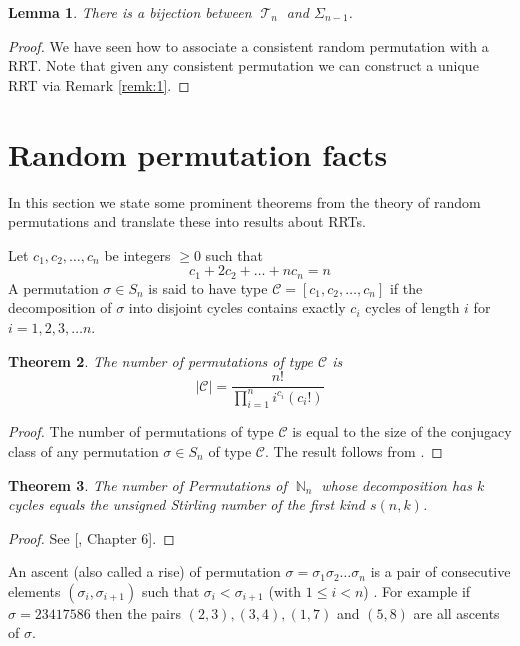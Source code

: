 \documentclass[oneside]{book} %
\newtheorem{thm}{Theorem}[section]
\newtheorem{lem}[thm]{Lemma}
\theoremstyle{definition}
\numberwithin{equation}{section}
\DeclareMathOperator{\T}{\mathcal{T}}
\DeclareMathOperator{\N}{\mathbb{N}}
\begin{document}
 
\begin{lem}
  There is a bijection between $\T_n$ and $\Sigma_{n-1}$.
\end{lem}
\begin{proof}
 We have seen how to associate a consistent random permutation with a RRT.  Note that given any consistent permutation we can construct  a unique RRT via Remark \ref{remk:1}.    
\end{proof}

\section{Random permutation facts}
In this section we state some prominent theorems from the theory of random permutations and translate these into results 
about RRTs.  

Let $c_1,c_2,\dots,c_n$ be integers $\geq 0$ such that 
\[c_1 + 2c_2 + \dots + nc_n = n\]
A permutation $\sigma \in S_n$ is said to have type $\mathcal{C} = [c_1,c_2,\dots , c_n]$ if the decomposition of $\sigma$ into disjoint cycles contains exactly $c_i$ cycles of length $i$ for $i = 1,2,3,\dots n$.  

\begin{thm}\label{thm:perms}
 The number of permutations of type $\mathcal{C}$ is 
 \[
  \lvert \mathcal{C} \rvert = \frac{n!}{\prod_{i=1}^{n}i^{c_{i}}(c_i!)}
 \]

\end{thm}
\begin{proof}
 The number of permutations of type $\mathcal{C}$ is equal to the size of the conjugacy class of any permutation $\sigma \in S_n$ of type $\mathcal{C}$.  The result follows from  \cite{Sagan}.
\end{proof}

\begin{thm}\label{thm:stirling}
 The number of Permutations of $\N_n$ whose decomposition has $k$ cycles equals the unsigned Stirling number of the first kind $s(n,k)$.
\end{thm}
\begin{proof}
 See [\cite{Comtet}, Chapter 6]. 
\end{proof}

An ascent (also called a rise) of permutation $\sigma = \sigma_1\sigma_2 \dots\sigma_n$ is a pair of consecutive elements 
$(\sigma_i,\sigma_{i+1})$ such that $\sigma_i < \sigma_{i+1}$  (with $1 \leq i < n$) \cite{Flajolet}.  For example if 
$\sigma = 23417586$ then the pairs $(2,3), (3,4),(1,7)$ and $(5,8)$ are all ascents of $\sigma$.  
\end{document}
